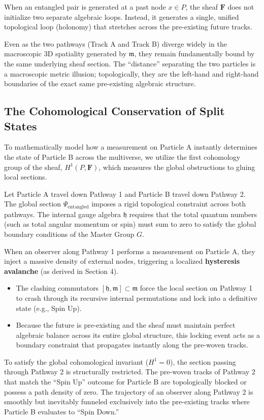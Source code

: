 \documentclass[12pt,letterpaper]{article}
\begin{document}
When an entangled pair is generated at a past node $x \in P$, the sheaf $\mathbf{F}$ does not initialize two separate algebraic loops. Instead, it generates a single, unified topological loop (holonomy) that stretches across the pre-existing future tracks.

Even as the two pathways (Track A and Track B) diverge widely in the macroscopic 3D spatiality generated by $\mathfrak{m}$, they remain fundamentally bound by the same underlying sheaf section. The ``distance'' separating the two particles is a macroscopic metric illusion; topologically, they are the left-hand and right-hand boundaries of the exact same pre-existing algebraic structure.

\subsection{The Cohomological Conservation of Split States}
To mathematically model how a measurement on Particle A instantly determines the state of Particle B across the multiverse, we utilize the first cohomology group of the sheaf, $H^1(P, \mathbf{F})$, which measures the global obstructions to gluing local sections.

Let Particle A travel down Pathway 1 and Particle B travel down Pathway 2. The global section $\Psi_{\text{entangled}}$ imposes a rigid topological constraint across both pathways. The internal gauge algebra $\mathfrak{h}$ requires that the total quantum numbers (such as total angular momentum or spin) must sum to zero to satisfy the global boundary conditions of the Master Group $G$.

When an observer along Pathway 1 performs a measurement on Particle A, they inject a massive density of external nodes, triggering a localized \textbf{hysteresis avalanche} (as derived in Section 4).
\begin{itemize}
    \item The clashing commutators $[\mathfrak{h}, \mathfrak{m}] \subset \mathfrak{m}$ force the local section on Pathway 1 to crash through its recursive internal permutations and lock into a definitive state (e.g., Spin Up).
    \item Because the future is pre-existing and the sheaf must maintain perfect algebraic balance across its entire global structure, this locking event acts as a boundary constraint that propagates instantly along the pre-woven tracks.
\end{itemize}

To satisfy the global cohomological invariant ($H^1=0$), the section passing through Pathway 2 is structurally restricted. The pre-woven tracks of Pathway 2 that match the ``Spin Up'' outcome for Particle B are topologically blocked or possess a path density of zero. The trajectory of an observer along Pathway 2 is smoothly but inevitably funneled exclusively into the pre-existing tracks where Particle B evaluates to ``Spin Down.''
\end{document}
